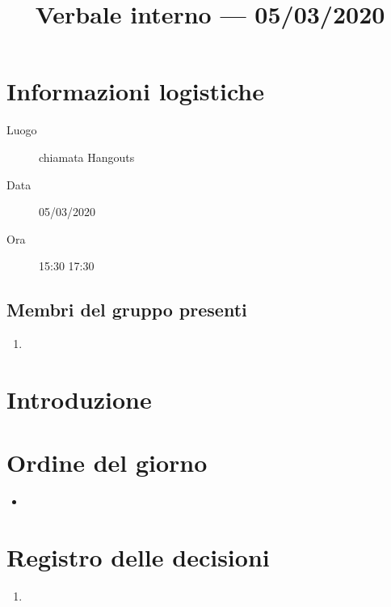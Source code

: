\documentclass{article}
\title{Verbale interno --- 05/03/2020}
\begin{document}


\section{Informazioni logistiche}%
\label{sec:informazioni_logistiche}

\begin{description}
  \item [Luogo] chiamata Hangouts
  \item [Data] 05/03/2020
  \item [Ora] 15:30  17:30
\end{description}

\subsection{Membri del gruppo presenti}%
\label{sub:membri_del_gruppo_presenti}

\begin{enumerate}
  \item {}
\end{enumerate}

\section{Introduzione}%
\label{sec:introduzione}

\placeholder{\dots}

\section{Ordine del giorno}%
\label{sec:ordine_del_giorno}

\begin{itemize}
  \item \placeholder{\dots}
\end{itemize}


\newpage
\section{Registro delle decisioni}%
\label{sec:registro_delle_decisioni}

\begin{enumerate}
  \item \placeholder{\dots}
\end{enumerate}

\end{document}
